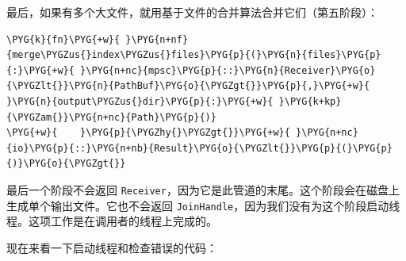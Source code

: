 最后，如果有多个大文件，就用基于文件的合并算法合并它们（第五阶段）：

\begin{Verbatim}[commandchars=\\\{\},breaklines=true,breakanywhere=true,fontsize=\codefont,xleftmargin=17bp]
\PYG{k}{fn}\PYG{+w}{ }\PYG{n+nf}{merge\PYGZus{}index\PYGZus{}files}\PYG{p}{(}\PYG{n}{files}\PYG{p}{:}\PYG{+w}{ }\PYG{n+nc}{mpsc}\PYG{p}{::}\PYG{n}{Receiver}\PYG{o}{\PYGZlt{}}\PYG{n}{PathBuf}\PYG{o}{\PYGZgt{}}\PYG{p}{,}\PYG{+w}{ }\PYG{n}{output\PYGZus{}dir}\PYG{p}{:}\PYG{+w}{ }\PYG{k+kp}{\PYGZam{}}\PYG{n+nc}{Path}\PYG{p}{)}
\PYG{+w}{    }\PYG{p}{\PYGZhy{}\PYGZgt{}}\PYG{+w}{ }\PYG{n+nc}{io}\PYG{p}{::}\PYG{n+nb}{Result}\PYG{o}{\PYGZlt{}}\PYG{p}{(}\PYG{p}{)}\PYG{o}{\PYGZgt{}}
\end{Verbatim}

最后一个阶段不会返回 \texttt{Receiver}，因为它是此管道的末尾。这个阶段会在磁盘上生成单个输出文件。它也不会返回 \texttt{JoinHandle}，因为我们没有为这个阶段启动线程。这项工作是在调用者的线程上完成的。

现在来看一下启动线程和检查错误的代码：

